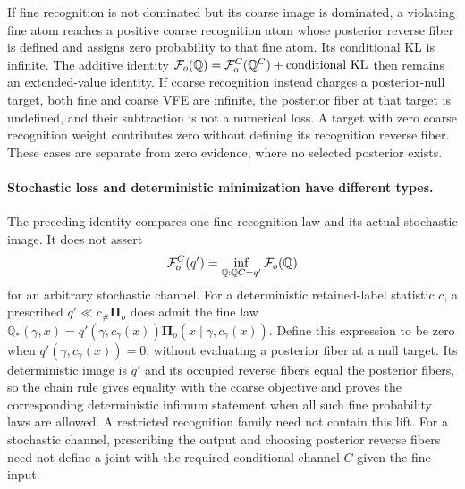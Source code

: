 If fine recognition is not dominated but its coarse image is dominated,
a violating fine atom reaches a positive coarse recognition atom whose
posterior reverse fiber is defined and assigns zero probability to that
fine atom. Its conditional KL is infinite. The additive identity
$\mathcal F_o(\mathbb Q)=\mathcal F_o^C(\mathbb Q^C)
 +\text{conditional KL}$ then remains an extended-value identity.
If coarse recognition instead charges a posterior-null target, both
fine and coarse VFE are infinite, the posterior fiber at that target is
undefined, and their subtraction is not a numerical loss. A target with
zero coarse recognition weight contributes zero without defining its
recognition reverse fiber. These cases are separate from zero evidence,
where no selected posterior exists.\thermoestablishedstatus

\paragraph{Stochastic loss and deterministic minimization have different types.}
The preceding identity compares one fine recognition law and its actual
stochastic image. It does not assert
\begin{equation}
 \mathcal F_o^C(q')
   =\inf_{\mathbb Q:\mathbb Q C=q'}\mathcal F_o(\mathbb Q)
 \label{eq:rg-thermo-finite-unwarranted-infimum}
\end{equation}
for an arbitrary stochastic channel. For a deterministic retained-label
statistic $c$, a prescribed $q'\ll c_\#\boldsymbol\Pi_o$ does admit
the fine law
$\mathbb Q_*(\gamma,x)
 =q'(\gamma,c_\gamma(x))
   \boldsymbol\Pi_o(x\mid\gamma,c_\gamma(x))$.
Define this expression to be zero when $q'(\gamma,c_\gamma(x))=0$,
without evaluating a posterior fiber at a null target.
Its deterministic image is $q'$ and its occupied reverse fibers equal
the posterior fibers, so the chain rule gives equality with the coarse
objective and proves the corresponding deterministic infimum statement
when all such fine probability laws are allowed. A restricted recognition
family need not contain this lift. For a stochastic channel, prescribing
the output and choosing posterior reverse fibers need not define a joint
with the required conditional channel $C$ given the fine input.\thermoestablishedstatus

